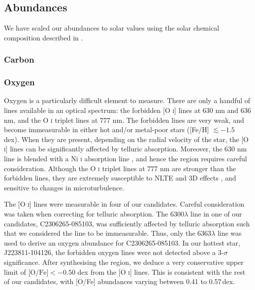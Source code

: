\documentclass{emulateapj}
\begin{document}


\subsection{Abundances}
We have scaled our abundances to solar values using the solar chemical composition described in \citet{asplund;et-al_2009}.

\subsubsection{Carbon}

\subsubsection{Oxygen}
\label{sec:oxygen-abundances}
Oxygen is a particularly difficult element to measure. There are only a handful of lines available in an optical spectrum: the forbidden [O \textsc{i}] lines at 630 nm and 636 nm, and the O \textsc{i} triplet lines at 777 nm. The forbidden lines are very weak, and become immeasurable in either hot and/or metal-poor stars ([Fe/H] $\lesssim -1.5$ dex). When they are present, depending on the radial velocity of the star, the [O \textsc{i}] lines can be significantly affected by telluric absorption. Moreover, the 630 nm line is blended with a Ni \textsc{i} absorption line \citep{allende-prieto;et-al_2001}, and hence the region requires careful consideration. Although the O \textsc{i} triplet lines at 777 nm are stronger than the forbidden lines, they are extremely susceptible to NLTE and 3D effects \citep{asplund;perez_2001}, and sensitive to changes in microturbulence. 

The [O \textsc{i}] lines were measurable in four of our candidates. Careful consideration was taken when correcting for telluric absorption. The 6300$\lambda$ line in one of our candidates, C2306265-085103, was sufficiently affected by telluric absorption such that we considered the line to be immeasurable. Thus, only the 6363$\lambda$ line was used to derive an oxygen abundance for C2306265-085103. In our hottest star, J223811-104126, the forbidden oxygen lines were not detected above a 3-$\sigma$ significance. After synthesising the region, we deduce a very conservative upper limit of $\mbox{[O/Fe]} < -0.50$ dex from the [O \textsc{i}] lines. This is consistent with the rest of our candidates, with [O/Fe] abundances varying between 0.41 to 0.57\,dex.
\end{document}
